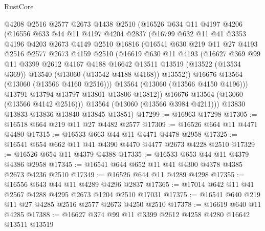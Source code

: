 \begin{lexlean}{RustCore}
\begin{coremodule}
          @4208
          @2516
          @2577
          @2673
          @1438
          @2510
          (@16526
            @634
            @11
            @4197
            @4206
            (@16556
              @633
              @44
              @11
              @4197
              @4204
              @2837
              (@16799
                @632
                @11
                @41
                @3353
                @4196
                @4203
                @2673
                @4149
                @2510
                @16816
                (@16541
                  @630
                  @219
                  @11
                  @27
                  @4193
                  @2516
                  @2577
                  @2673
                  @4159
                  @2510
                  (@16619
                    @630
                    @11
                    @4193
                    (@16627
                      @369
                      @99
                      @11
                      @3399
                      @2612
                      @4167
                      @4188
                      @16642
                      @13511
                      @13519
                      (@13522 (@13534 @369))
                      @13540
                      (@13060 (@13542 @4188 @4168))
                      @13552))
                  @16676
                  @13564
                  (@13060 (@13566 @4160 @2516)))
                @13564
                (@13060 (@13566 @4150 @4196)))
              @13791
              @13794
              @13797
              @13801
              @13806
              @13812))
          @16676
          @13564
          (@13060 (@13566 @4142 @2516)))
        @13564
        (@13060 (@13566 @3984 @4211)))
      @13830
      @13833
      @13836
      @13840
      @13845
      @13851)
@17299 := @16963 @17298
@17305 := @16518 @664 @219 @11 @27 @4482 @2577
@17309 := @16526 @664 @11 @4471 @4480
@17315 := @16533 @663 @44 @11 @4471 @4478 @2958
@17325 := @16541 @654 @662 @11 @41 @4390 @4470 @4477 @2673 @4228 @2510
@17329 := @16526 @654 @11 @4379 @4388
@17335 := @16533 @653 @44 @11 @4379 @4386 @2958
@17345 := @16541 @644 @652 @11 @41 @4300 @4378 @4385 @2673 @4236 @2510
@17349 := @16526 @644 @11 @4289 @4298
@17355 := @16556 @643 @44 @11 @4289 @4296 @2837
@17365 := @17014 @642 @11 @41 @2567 @4288 @4295 @2673 @1204 @2510 @17031
@17375 := @16541 @640 @219 @11 @27 @4285 @2516 @2577 @2673 @4250 @2510
@17378 := @16619 @640 @11 @4285
@17388 := @16627 @374 @99 @11 @3399 @2612 @4258 @4280 @16642 @13511 @13519

\end{coremodule}
\end{lexlean}
